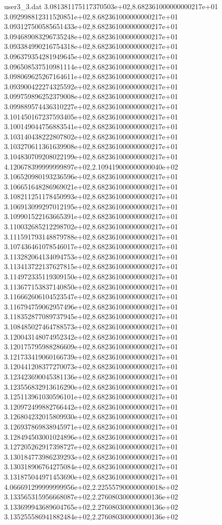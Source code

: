 \begin{filecontents}{user3_3.dat}
3.081381175117370503e+02,8.682361000000000217e+01
3.092998812311520851e+02,8.682361000000000217e+01
3.093127500585651433e+02,8.682361000000000217e+01
3.094689083296735248e+02,8.682361000000000217e+01
3.093384990216754318e+02,8.682361000000000217e+01
3.096379354281949645e+02,8.682361000000000217e+01
3.096508537510981114e+02,8.682361000000000217e+01
3.098069625267164611e+02,8.682361000000000217e+01
3.093900422274325592e+02,8.682361000000000217e+01
3.099759896252379008e+02,8.682361000000000217e+01
3.099889574436310227e+02,8.682361000000000217e+01
3.101450167237593405e+02,8.682361000000000217e+01
3.100149044756883541e+02,8.682361000000000217e+01
3.103140438222807802e+02,8.682361000000000217e+01
3.103270611361639908e+02,8.682361000000000217e+01
3.104830709208022199e+02,8.682361000000000217e+01
4.120678399999999897e+02,2.109419000000000040e+02
3.106520980193236596e+02,8.682361000000000217e+01
3.106651648286969021e+02,8.682361000000000217e+01
3.108211251178450993e+02,8.682361000000000217e+01
3.106913099297012195e+02,8.682361000000000217e+01
3.109901522163665391e+02,8.682361000000000217e+01
3.110032685212298702e+02,8.682361000000000217e+01
3.111591793148879788e+02,8.682361000000000217e+01
3.107436461078546017e+02,8.682361000000000217e+01
3.113282064134094753e+02,8.682361000000000217e+01
3.113413722137627815e+02,8.682361000000000217e+01
3.114972335119309150e+02,8.682361000000000217e+01
3.113677153837140850e+02,8.682361000000000217e+01
3.116662606104523547e+02,8.682361000000000217e+01
3.116794759062957496e+02,8.682361000000000217e+01
3.118352877089737945e+02,8.682361000000000217e+01
3.108485027464788573e+02,8.682361000000000217e+01
3.120043148074952342e+02,8.682361000000000217e+01
3.120175795988286609e+02,8.682361000000000217e+01
3.121733419060166739e+02,8.682361000000000217e+01
3.120441208377270073e+02,8.682361000000000217e+01
3.123423690045381136e+02,8.682361000000000217e+01
3.123556832913616290e+02,8.682361000000000217e+01
3.125113961030596101e+02,8.682361000000000217e+01
3.120972499882766442e+02,8.682361000000000217e+01
3.126804232015809930e+02,8.682361000000000217e+01
3.126937869838945971e+02,8.682361000000000217e+01
3.128494503001024896e+02,8.682361000000000217e+01
3.127205262917398727e+02,8.682361000000000217e+01
3.130184773986239293e+02,8.682361000000000217e+01
3.130318906764275084e+02,8.682361000000000217e+01
3.131875044971453690e+02,8.682361000000000217e+01
4.066691299999999956e+02,2.225557900000000018e+02
3.133565315956668087e+02,2.276080300000000136e+02
3.133699943689604765e+02,2.276080300000000136e+02
3.135255586941882484e+02,2.276080300000000136e+02

\end{filecontents}

